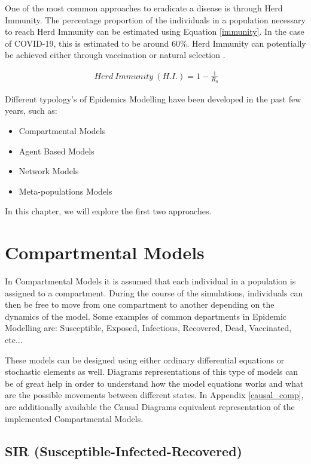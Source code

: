 One of the most common approaches to eradicate a disease is through Herd Immunity. The percentage proportion of the individuals in a population necessary to reach Herd Immunity can be estimated using Equation \ref{immunity}. In the case of COVID-19, this is estimated to be around 60\%. Herd Immunity can potentially be achieved either through vaccination or natural selection \cite{blob}.

\useshortskip
\begin{align}
\ Herd\:Immunity\:(H.I.) = 1 - \frac{1}{R_{0}}
\label{immunity}
\end{align}
\useshortskip

Different typology's of Epidemics Modelling have been developed in the past few years, such as:
\begin{itemize}
    \setlength\itemsep{-0.3cm}
    \item Compartmental Models
    \item Agent Based Models
    \item Network Models
    \item Meta-populations Models
\end{itemize}

In this chapter, we will explore the first two approaches.

\section{Compartmental Models}

In Compartmental Models it is assumed that each individual in a population is assigned to a compartment. During the course of the simulations, individuals can then be free to move from one compartment to another depending on the dynamics of the model. Some examples of common departments in Epidemic Modelling are: Susceptible, Exposed, Infectious, Recovered, Dead, Vaccinated, etc...

These models can be designed using either ordinary differential equations or stochastic elements as well. Diagrams representations of this type of models can be of great help in order to understand how the model equations works and what are the possible movements between different states. In Appendix \ref{causal_comp}, are additionally available the Causal Diagrams equivalent representation of the implemented Compartmental Models. 

\subsection{SIR (Susceptible-Infected-Recovered)}
\label{sir_sec}

